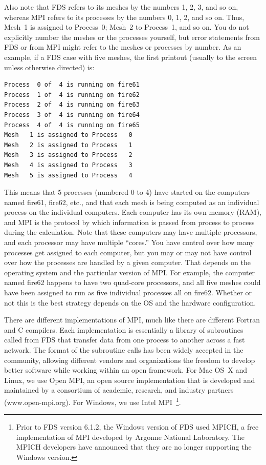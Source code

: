 \documentclass[11pt]{book}
\begin{document}
Also note that FDS refers to its meshes by the numbers 1, 2, 3, and so on, whereas MPI refers to its processes by the numbers 0, 1, 2, and so on. Thus, Mesh~1 is assigned to Process~0; Mesh~2 to Process~1, and so on. You do not explicitly number the meshes or the processes yourself, but error statements from FDS or from MPI might refer to the meshes or processes by number. As an example, if a FDS case with five meshes, the first printout (usually to the screen unless otherwise directed) is:
\begin{lstlisting}
Process  0 of  4 is running on fire61
Process  1 of  4 is running on fire62
Process  2 of  4 is running on fire63
Process  3 of  4 is running on fire64
Process  4 of  4 is running on fire65
Mesh   1 is assigned to Process   0
Mesh   2 is assigned to Process   1
Mesh   3 is assigned to Process   2
Mesh   4 is assigned to Process   3
Mesh   5 is assigned to Process   4
\end{lstlisting}
This means that 5 processes (numbered 0 to 4) have started on the computers named fire61, fire62, etc., and that each mesh is being computed as an individual process on the individual computers. Each computer has its own memory (RAM), and MPI is the protocol by which information is passed from process to process during the calculation. Note that these computers may have multiple processors, and each processor may have multiple ``cores.'' You have control over how many processes get assigned to each computer, but you may or may not have control over how the processes are handled by a given computer. That depends on the operating system and the particular version of MPI. For example, the computer named fire62 happens to have two quad-core processors, and all five meshes could have been assigned to run as five individual processes all on fire62. Whether or not this is the best strategy depends on the OS and the hardware configuration.

There are different implementations of MPI, much like there are different Fortran and C compilers. Each implementation is essentially a library of subroutines called from FDS that transfer data from one process to another across a fast network. The format of the subroutine calls has been widely accepted in the community, allowing different vendors and organizations the freedom to develop better software while working within an open framework. For Mac OS~X and Linux, we use Open MPI, an open source implementation that is developed and maintained by a consortium of academic, research, and industry partners (www.open-mpi.org). For Windows, we use Intel MPI~\footnote{Prior to FDS version 6.1.2, the Windows version of FDS used MPICH, a free implementation of MPI developed by Argonne National Laboratory. The MPICH developers have announced that they are no longer supporting the Windows version.}.
\end{document}
